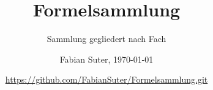 \documentclass[8pt, a4paper, fleqn, landscape]{scrartcl}
\title{Formelsammlung}
\subtitle{Sammlung gegliedert nach Fach}
\author{Fabian Suter, \today}
\date{{\small \url{https://github.com/FabianSuter/Formelsammlung.git}}}
\begin{document}
	\begin{multicols*}{2}
		\maketitle
	 

		


		
	
	\end{multicols*}	
\end{document}
